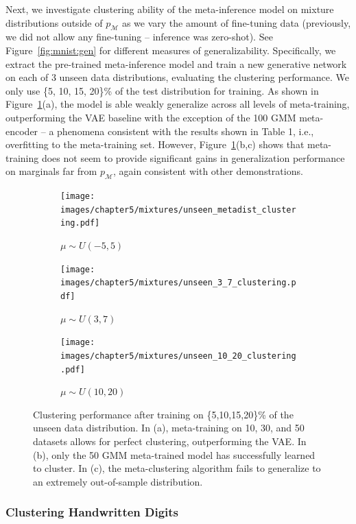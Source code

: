 Next, we investigate clustering ability of the meta-inference model on mixture distributions outside of $p_{\mathcal{M}}$ as we vary the amount of fine-tuning data (previously, we did not allow any fine-tuning -- inference was zero-shot). See Figure~\ref{fig:mnist:gen} for different measures of generalizability. Specifically, we extract the pre-trained meta-inference model and train a new generative network on each of 3 unseen data distributions, evaluating the clustering performance. We only use \{5, 10, 15, 20\}\% of the test distribution for training. As shown in Figure~\ref{fig:extra:mnist}(a), the model is able weakly generalize across all levels of meta-training, outperforming the VAE baseline with the exception of the 100 GMM meta-encoder -- a phenomena consistent with the results shown in Table 1, i.e., overfitting to the meta-training set. However, Figure~\ref{fig:extra:mnist}(b,c) shows that meta-training does not seem to provide significant gains in generalization performance on marginals far from $p_{\mathcal{M}}$, again consistent with other demonstrations.

\begin{figure}
\centering     %
\begin{subfigure}[b]{0.32\linewidth}
    \texttt{[image: images/chapter5/mixtures/unseen\_metadist\_clustering.pdf]}
    \caption{$\mu \sim U(-5, 5)$}
\end{subfigure}
\begin{subfigure}[b]{0.32\linewidth}
    \texttt{[image: images/chapter5/mixtures/unseen\_3\_7\_clustering.pdf]}
    \caption{$\mu \sim U(3, 7)$}
\end{subfigure}
\begin{subfigure}[b]{0.32\linewidth}
    \texttt{[image: images/chapter5/mixtures/unseen\_10\_20\_clustering.pdf]}
    \caption{$\mu \sim U(10, 20)$}
\end{subfigure}
\caption{Clustering performance after training on \{5,10,15,20\}\% of the unseen data distribution. In (a), meta-training on 10, 30, and 50 datasets allows for perfect clustering, outperforming the VAE. In (b), only the 50 GMM meta-trained model has successfully learned to cluster. In (c), the meta-clustering algorithm fails to generalize to an extremely out-of-sample distribution.}
\label{fig:extra:mnist}
\end{figure}

\subsubsection{Clustering Handwritten Digits}

